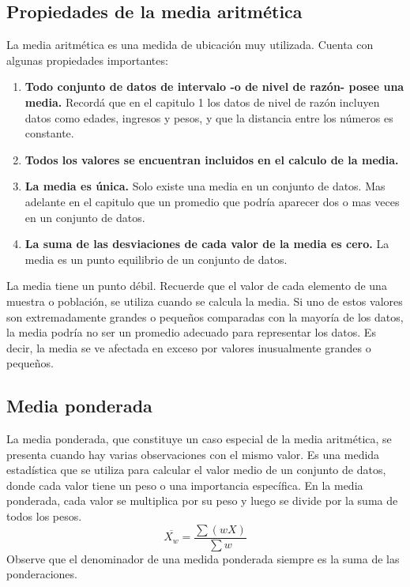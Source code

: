 \documentclass[]{article}
\begin{document}
\subsection{Propiedades de la media aritmética}
La media aritmética es una medida de ubicación muy utilizada. Cuenta con algunas propiedades importantes:
\begin{enumerate}
	\item \textbf{Todo conjunto de datos de intervalo -o de nivel de razón- posee una media.} Recordá que en el capitulo 1 los datos de nivel de razón incluyen datos como edades, ingresos y pesos, y que la distancia entre los números es constante.
	\item \textbf{Todos los valores se encuentran incluidos en el calculo de la media.}
	\item \textbf{La media es única.} Solo existe una media en un conjunto de datos. Mas adelante en el capitulo que un promedio que podría aparecer dos o mas veces en un conjunto de datos.
	\item \textbf{La suma de las desviaciones de cada valor de la media es cero.} La media es un punto equilibrio de un conjunto de datos.
\end{enumerate}
La media tiene un punto débil. Recuerde que el valor de cada elemento de una muestra o población, se utiliza cuando se calcula la media. Si uno de estos valores son extremadamente grandes o pequeños comparadas con la mayoría de los datos, la media podría no ser un promedio adecuado para representar los datos. Es decir, la media se ve afectada en exceso por valores inusualmente grandes o pequeños.

\subsection{Media ponderada}
La media ponderada, que constituye un caso especial de la media aritmética, se presenta cuando hay varias observaciones con el mismo valor. Es una medida estadística que se utiliza para calcular el valor medio de un conjunto de datos, donde cada valor tiene un peso o una importancia específica. En la media ponderada, cada valor se multiplica por su peso y luego se divide por la suma de todos los pesos.
\[\overline{X_{w}} = \frac{\sum (wX)}{\sum w} \]
Observe que el denominador de una medida ponderada siempre es la suma de las ponderaciones.
\end{document}
